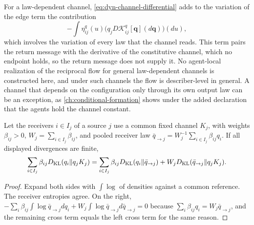 For a law-dependent channel, \cref{eq:dyn-channel-differential} adds to the variation of the edge term the contribution
\begin{equation}
 -\int\eta^q_{ij}(u)\bigl(q_jD\mathcal K^q_{ij}[\mathbf q](d\mathbf q)\bigr)(du),
 \label{eq:dyn-return-channel-term}
\end{equation}
which involves the variation of every law that the channel reads. This term pairs the return message with the derivative of the constitutive channel, which no endpoint holds, so the return message does not supply it. No agent-local realization of the reciprocal flow for general law-dependent channels is constructed here, and under such channels the flow is describer-level in general. A channel that depends on the configuration only through its own output law can be an exception, as \cref{ch:conditional-formation} shows under the added declaration that the agents hold the channel constant.

Let the receivers $i\in I_j$ of a source $j$ use a common fixed channel $K_j$, with weights $\beta_{ij}>0$, $W_j=\sum_{i\in I_j}\beta_{ij}$, and pooled receiver law $\bar q_{\to j}=W_j^{-1}\sum_{i\in I_j}\beta_{ij}q_i$. If all displayed divergences are finite,
\begin{equation}
 \sum_{i\in I_j}\beta_{ij}D_{\mathrm{KL}}(q_i\Vert q_jK_j)
 =\sum_{i\in I_j}\beta_{ij}D_{\mathrm{KL}}(q_i\Vert\bar q_{\to j})
 +W_jD_{\mathrm{KL}}(\bar q_{\to j}\Vert q_jK_j).
 \label{eq:dyn-compensation}
\end{equation}
\begin{proof}
Expand both sides with $\int\log$ of densities against a common reference. The receiver entropies agree. On the right, $-\sum_i\beta_{ij}\int\log\bar q_{\to j}dq_i+W_j\int\log\bar q_{\to j}d\bar q_{\to j}=0$ because $\sum_i\beta_{ij}q_i=W_j\bar q_{\to j}$, and the remaining cross term equals the left cross term for the same reason.
\end{proof}

